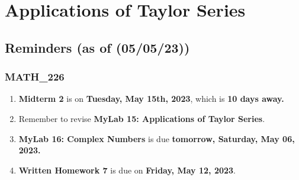 \chapter{Applications of Taylor Series}
\section{Reminders (as of (05/05/23))}
\subsection{MATH\_226}
\begin{enumerate}
  \item  \textbf{Midterm 2} is on \textbf{Tuesday, May 15th, 2023}, which is \textbf{10 days away.}
  \item Remember to revise \textbf{MyLab 15:
        Applications of Taylor Series}.
  \item \textbf{MyLab 16: Complex Numbers} is
        due \textbf{tomorrow, Saturday, May 06, 2023.}
  \item \textbf{Written Homework 7} is due on
        \textbf{Friday, May 12, 2023}.
\end{enumerate}
